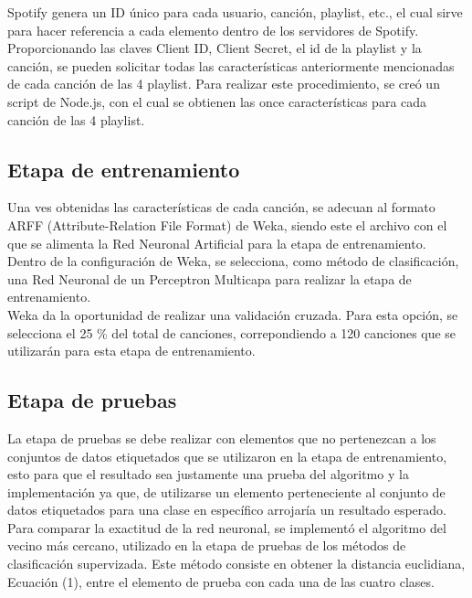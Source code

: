 \documentclass[conference]{IEEEtran}
\begin{document}
Spotify genera un ID único para cada usuario, canción, playlist, etc., el cual sirve para hacer referencia a cada elemento dentro de los servidores de Spotify. Proporcionando las claves Client ID, Client Secret, el id de la playlist y la canción, se pueden solicitar todas las características anteriormente mencionadas de cada canción de las 4 playlist. Para realizar este procedimiento, se creó un script de Node.js, con el cual se obtienen las once características para cada canción de las 4 playlist.\\

\subsection{Etapa de entrenamiento}
Una ves obtenidas las características de cada canción, se adecuan al formato ARFF (Attribute-Relation File Format) de Weka, siendo este el archivo con el que se alimenta la Red Neuronal Artificial para la etapa de entrenamiento.\\
Dentro de la configuración de Weka, se selecciona, como método de clasificación, una Red Neuronal de un Perceptron Multicapa para realizar la etapa de entrenamiento.\\

Weka da la oportunidad de realizar una validación cruzada. Para esta opción, se selecciona el 25 \% del total de canciones, correpondiendo a 120 canciones que se utilizarán para esta etapa de entrenamiento.



\subsection{Etapa de pruebas}
La etapa de pruebas se debe realizar con elementos que no pertenezcan a los conjuntos de datos etiquetados que se utilizaron en la etapa de entrenamiento, esto para que el resultado sea justamente una prueba del algoritmo y la implementaci\'on ya que, de utilizarse un elemento perteneciente al conjunto de datos etiquetados para una clase en espec\'ifico arrojar\'ia un resultado esperado.\\

Para comparar la exactitud de la red neuronal, se implementó el algoritmo del vecino m\'as cercano, utilizado en la etapa de pruebas de los métodos de clasificación supervizada. Este m\'etodo consiste en obtener la distancia euclidiana, Ecuaci\'on (1), entre el elemento de prueba con cada una de las cuatro clases.
\end{document}
